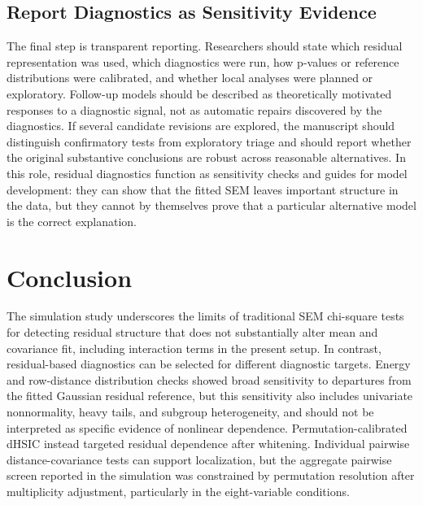 \documentclass[floatsintext,a4paper]{apa7} %
\begin{document}
	\subsection{Report Diagnostics as Sensitivity Evidence}
	The final step is transparent reporting. Researchers should state which residual representation was used, which diagnostics were run, how p-values or reference distributions were calibrated, and whether local analyses were planned or exploratory. Follow-up models should be described as theoretically motivated responses to a diagnostic signal, not as automatic repairs discovered by the diagnostics. If several candidate revisions are explored, the manuscript should distinguish confirmatory tests from exploratory triage and should report whether the original substantive conclusions are robust across reasonable alternatives. In this role, residual diagnostics function as sensitivity checks and guides for model development: they can show that the fitted SEM leaves important structure in the data, but they cannot by themselves prove that a particular alternative model is the correct explanation.
	
	
	\section{Conclusion}
	
	The simulation study underscores the limits of traditional SEM chi-square tests for detecting residual structure that does not substantially alter mean and covariance fit, including interaction terms in the present setup. In contrast, residual-based diagnostics can be selected for different diagnostic targets. Energy and row-distance distribution checks showed broad sensitivity to departures from the fitted Gaussian residual reference, but this sensitivity also includes univariate nonnormality, heavy tails, and subgroup heterogeneity, and should not be interpreted as specific evidence of nonlinear dependence. Permutation-calibrated dHSIC instead targeted residual dependence after whitening. Individual pairwise distance-covariance tests can support localization, but the aggregate pairwise screen reported in the simulation was constrained by permutation resolution after multiplicity adjustment, particularly in the eight-variable conditions.
	
\end{document}
